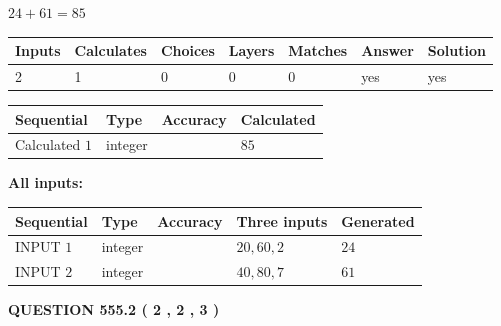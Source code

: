 \documentclass[12pt]{article}
\begin{document}
 

$ %
24 +  %
61=   %
85$
 
 
\noindent{}
 
 

 
   
   
   
   
\noindent\begin{tabular}{|l|l|l|l|l|l|l|}
 \hline
Inputs & Calculates & Choices & Layers & Matches & Answer & Solution \\ \hline
 2  & 
 1  & 
 0
  & 
 0  & 
 0  & 
  yes & 
  yes 
  \\ \hline
 \end{tabular}
   
   
   
   
\noindent{}
   
   
  
  
\noindent\begin{tabular}{|l|l|l|l|}
\hline
 Sequential & Type & Accuracy & Calculated \\ 
\hline
 
 
  Calculated $  1 $ & integer &  & 
  $ 85 $ 
 \\  \hline  
 \end{tabular}
   
   
   
   
\noindent\vspace{0.1in}\hspace{-0.08in} {\textbf{\Large{All inputs: }}}
   
   
  
  
\noindent\begin{tabular}{|l|l|l|l|l|}
\hline
 Sequential & Type & Accuracy & Three inputs & Generated \\ 
\hline
 
 
  INPUT $  1 $ & integer &  & $
 20
 , 
 60
 , 
 2
 $ & $ 24 $ 
 \\  \hline  
 
 
  INPUT $  2 $ & integer &  & $
 40
 , 
 80
 , 
 7
 $ & $ 61 $ 
 \\  \hline  
 \end{tabular}
   
   
  
\vspace{0.2in}
  
{\textbf{\Large{QUESTION
555.2 
 ( 2 , 2 , 3 )
}}}
  
\end{document}
